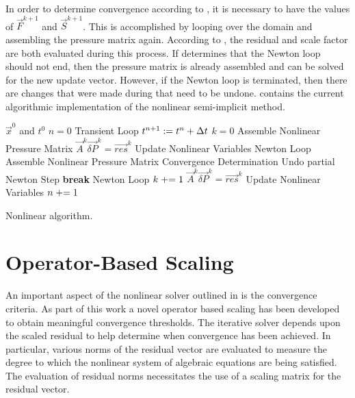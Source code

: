 In order to determine convergence according to , it is necessary to have the values of $\vec{F}^{k+1}$ and $\vec{S}^{k+1}$.
This is accomplished by looping over the domain and assembling the pressure matrix again.
According to , the residual and scale factor are both evaluated during this process.
If  determines that the Newton loop should not end, then the pressure matrix is already assembled and can be solved for the new update vector.
However, if the Newton loop is terminated, then there are changes that were made during  that need to be undone.
 contains the current algorithmic implementation of the nonlinear semi-implicit method.

\begin{algo}[h!]
\setlength{\baselineskip}{0.625\baselineskip}
\begin{algorithmic}[1]
\Require $\vec{x}^{0}$ and $t^{0}$
\Set $n = 0$
\Loop \; Transient Loop
    \Set $t^{n+1} : = t^{n} + \dt{}$
    \Set $k = 0$
	\Algorithm Assemble Nonlinear Pressure Matrix	 
	\Solve $\vec{A}^{k} \vec{\delta P}^{k} = \vec{res}^{k}$
	\Algorithm Update Nonlinear Variables  
    \Loop \; Newton Loop
		\Algorithm Assemble Nonlinear Pressure Matrix 
		\Algorithm Convergence Determination 
			\State Undo partial Newton Step
			\State \textbf{break} Newton Loop 
		\EndIf		
		\Set $k \mathrel{+}= 1$
		\Solve $\vec{A}^{k} \vec{\delta P}^{k} = \vec{res}^{k}$
		\Algorithm Update Nonlinear Variables 
	\EndLoop
	\Set $n \mathrel{+}= 1$
\EndLoop
\end{algorithmic}
\caption{Nonlinear \cobra{} algorithm.}
\label{alg:nlnCobraAlgorithm}
\end{algo}

\section{Operator-Based Scaling}
\label{sect:nlnScaling}

An important aspect of the nonlinear solver outlined in  is the convergence criteria.
As part of this work a novel operator based scaling has been developed to obtain meaningful convergence thresholds.
The iterative solver depends upon the scaled residual to help determine when convergence has been achieved.
In particular, various norms of the residual vector are evaluated to measure the degree to which the nonlinear system of algebraic equations are being satisfied.
The evaluation of residual norms necessitates the use of a scaling matrix for the residual vector.

